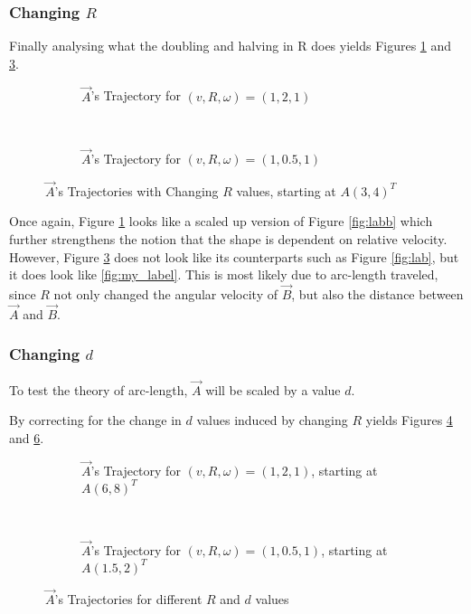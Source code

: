 \documentclass[pstricks, border=12pt]{article}
\begin{document}
\subsubsection{Changing $R$}
Finally analysing what the doubling and halving in R does yields Figures \ref{r1} and \ref{r2}.

\begin{figure}[tbh]
\centering
    \begin{subfigure}[t]{0.5\linewidth}
         \centering
         
         \caption{$\vec A$'s Trajectory for $(v, R, \omega) = (1, 2, 1)$}
         \label{r1}
     \end{subfigure}%
    ~ 
     \begin{subfigure}[t]{0.5\linewidth}
             \centering
             
             \caption{$\vec A$'s Trajectory for $(v, R, \omega) = (1, 0.5, 1)$}
             \label{r2}
    \end{subfigure}
    \caption{$\vec A$'s Trajectories with Changing $R$ values, starting at $A(3, 4)^T$}
\end{figure}
Once again, Figure \ref{r1} looks like a scaled up version of Figure \ref{fig:labb} which further strengthens the notion that the shape is dependent on relative velocity. However, Figure \ref{r2} does not look like its counterparts such as Figure \ref{fig:lab}, but it does look like \ref{fig:my_label}. This is most likely due to arc-length traveled, since $R$ not only changed the angular velocity of $\vec B$, but also the distance between $\vec A$ and $\vec B$. 


\subsubsection{Changing $d$}
To test the theory of arc-length, $\vec A$ will be scaled by a value $d$.

By correcting for the change in $d$ values induced by changing $R$ yields Figures \ref{r3} and \ref{r4}.
\begin{figure}[tbh]
\centering
\begin{subfigure}[t]{0.5\linewidth}
    \centering
    
    \caption{$\vec A$'s Trajectory for $(v, R, \omega) = (1, 2, 1)$, starting at $A(6, 8)^T$}
    \label{r3}
\end{subfigure}%
    ~ 
\begin{subfigure}[t]{0.5\linewidth}
    \centering
    
    \caption{$\vec A$'s Trajectory for $(v, R, \omega) = (1, 0.5, 1)$, starting at $A(1.5, 2)^T$}
    \label{r4}
\end{subfigure}
\caption{$\vec A$'s Trajectories for different $R$ and $d$ values}
\end{figure}
\end{document}
